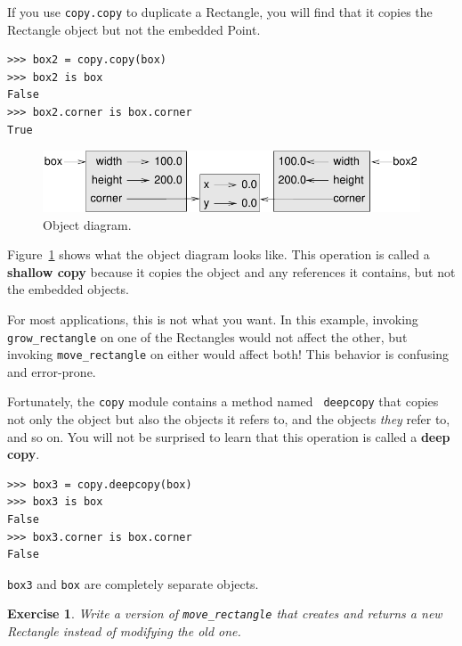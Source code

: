 \documentclass[12pt,a4paper,final,twoside,onecolumn,titlepage]{book}
\newtheorem{exercise}{Exercise}[chapter]
\begin{document}
If you use {\tt copy.copy} to duplicate a Rectangle, you will find
that it copies the Rectangle object but not the embedded Point.

\begin{verbatim}
>>> box2 = copy.copy(box)
>>> box2 is box
False
>>> box2.corner is box.corner
True
\end{verbatim}

\begin{figure}
\centerline
{\includegraphics[scale=0.8]{figs/rectangle2.pdf}}
\caption{Object diagram.}
\label{fig.rectangle2}
\end{figure}

Figure~\ref{fig.rectangle2} shows what the object diagram looks like.
This operation is called a {\bf shallow copy} because it copies the
object and any references it contains, but not the embedded objects.

For most applications, this is not what you want.  In this example,
invoking \verb"grow_rectangle" on one of the Rectangles would not
affect the other, but invoking \verb"move_rectangle" on either would
affect both!  This behavior is confusing and error-prone.

Fortunately, the {\tt copy} module contains a method named {\tt
deepcopy} that copies not only the object but also 
the objects it refers to, and the objects {\em they} refer to,
and so on.
You will not be surprised to learn that this operation is
called a {\bf deep copy}.

\begin{verbatim}
>>> box3 = copy.deepcopy(box)
>>> box3 is box
False
>>> box3.corner is box.corner
False
\end{verbatim}
%
{\tt box3} and {\tt box} are completely separate objects.


\begin{exercise}

Write a version of \verb"move_rectangle" that creates and
returns a new Rectangle instead of modifying the old one.

\end{exercise}
\end{document}
